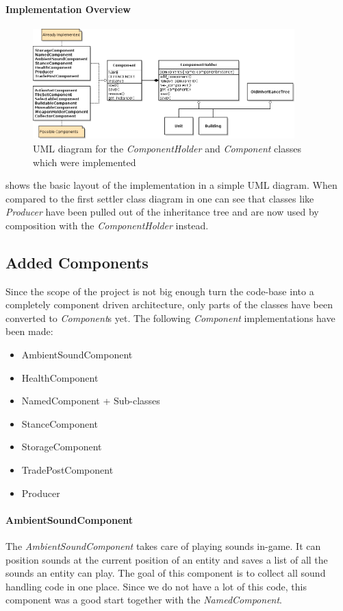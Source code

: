 \paragraph{Implementation Overview}
\begin{figure}[H]
\centering
\includegraphics[width=0.9\textwidth]{pics/components_implemented}
\caption{UML diagram for the \textit{ComponentHolder} and \textit{Component} classes which were implemented}
\label{fig:codeimpl}
\end{figure}

 shows the basic layout of the implementation in a simple UML diagram. When compared to the first
settler class diagram in  one can see that classes like \textit{Producer} have been pulled out of the
inheritance tree and are now used by composition with the \textit{ComponentHolder} instead.

\subsection{Added Components}
Since the scope of the project is not big enough turn the \UH{} code-base into a completely component driven
architecture, only parts of the classes have been converted to \textit{Component}s yet. The following \textit{Component}
implementations have been made:
\begin{itemize}
    \item AmbientSoundComponent
    \item HealthComponent
    \item NamedComponent + Sub-classes
    \item StanceComponent
    \item StorageComponent
    \item TradePostComponent
    \item Producer
\end{itemize}

\paragraph{AmbientSoundComponent}
The \textit{AmbientSoundComponent} takes care of playing sounds in-game. It can position sounds at the current position
of an entity and saves a list of all the sounds an entity can play. The goal of this component is to collect all sound
handling code in one place. Since we do not have a lot of this code, this component was a good start together with the
\textit{NamedComponent}.

